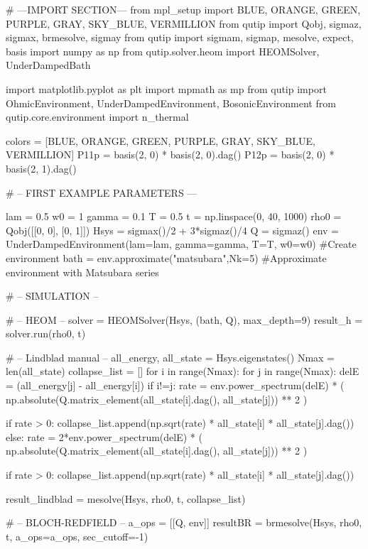 # ---IMPORT SECTION---
from mpl_setup import BLUE, ORANGE, GREEN, PURPLE, GRAY, SKY_BLUE, VERMILLION
from qutip import Qobj, sigmaz, sigmax, brmesolve, sigmay
from qutip import sigmam, sigmap, mesolve, expect, basis
import numpy as np
from qutip.solver.heom import HEOMSolver, UnderDampedBath

import matplotlib.pyplot as plt
import mpmath as mp
from qutip import OhmicEnvironment, UnderDampedEnvironment, BosonicEnvironment
from qutip.core.environment import n_thermal

colors = [BLUE, ORANGE, GREEN, PURPLE, GRAY, SKY_BLUE, VERMILLION]
P11p = basis(2, 0) * basis(2, 0).dag()
P12p = basis(2, 0) * basis(2, 1).dag()

# -- FIRST EXAMPLE PARAMETERS ---

lam = 0.5
w0 = 1
gamma = 0.1
T = 0.5
t = np.linspace(0, 40, 1000)
rho0 = Qobj([[0, 0], [0, 1]])
Hsys = sigmax()/2 + 3*sigmaz()/4
Q = sigmaz()
env = UnderDampedEnvironment(lam=lam, gamma=gamma, T=T, w0=w0) #Create environment
bath = env.approximate("matsubara",Nk=5) #Approximate environment with Matsubara series

# -- SIMULATION --

# -- HEOM --
solver = HEOMSolver(Hsys, (bath, Q), max_depth=9)
result_h = solver.run(rho0, t)

# -- Lindblad manual --
all_energy, all_state = Hsys.eigenstates()
Nmax = len(all_state)
collapse_list = []
for i in range(Nmax):
    for j in range(Nmax):
        delE = (all_energy[j] - all_energy[i])
        if i!=j:
            rate = env.power_spectrum(delE) * (
                np.absolute(Q.matrix_element(all_state[i].dag(), all_state[j])) ** 2
            )

            if rate > 0:
                collapse_list.append(np.sqrt(rate) * all_state[i] * all_state[j].dag())
        else:
            rate = 2*env.power_spectrum(delE) * (
                np.absolute(Q.matrix_element(all_state[i].dag(), all_state[j])) ** 2
            )

            if rate > 0:
                collapse_list.append(np.sqrt(rate) * all_state[i] * all_state[j].dag())

result_lindblad = mesolve(Hsys, rho0, t, collapse_list)




# -- BLOCH-REDFIELD --
a_ops = [[Q, env]]
resultBR = brmesolve(Hsys, rho0, t, a_ops=a_ops, sec_cutoff=-1)



